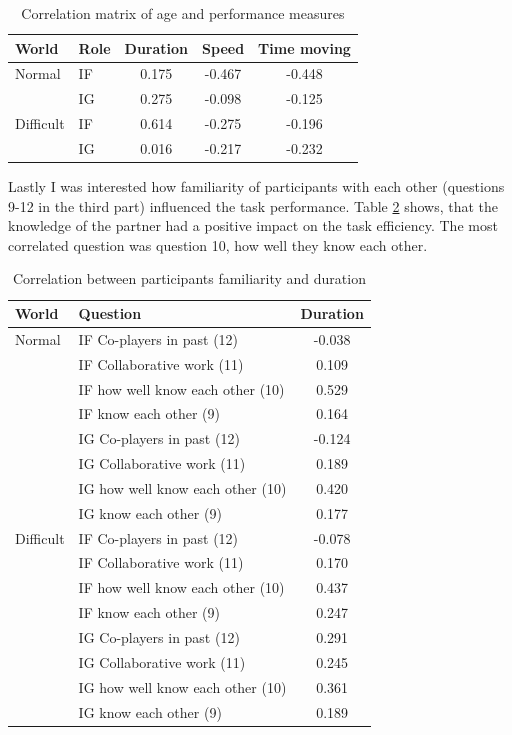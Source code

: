 \begin{table}[h!]
\centering
\begin{tabular}{llccc}
\toprule
World & Role  & Duration & Speed & Time moving  \\
\midrule
Normal 	& IF & 0.175 & -0.467 & -0.448\\
 		& IG & 0.275 & -0.098 & -0.125\\
\midrule
Difficult& IF & 0.614 &	-0.275 &-0.196\\
 		& IG  & 0.016 &	-0.217 &-0.232\\
\bottomrule
\end{tabular}
\caption{Correlation matrix of age and performance measures}
\label{tab:demfactors-age}
\end{table}

Lastly I was interested how familiarity of participants with each other (questions 9-12 in the third part) influenced the task performance. Table \ref{tab:demfactors-famother} shows, that the knowledge of the partner had a positive impact on the task efficiency. The most correlated question was question 10, how well they know each other.

\begin{table}[h!]
\centering
\begin{tabular}{llc}
\toprule
World & Question  & Duration \\
\midrule
Normal 	& IF Co-players in past (12) 	& -0.038\\
 		& IF Collaborative work 	(11)		& 0.109	 \\
 		& IF how well know each other (10)		& 0.529\\
 		& IF know each other (9)			& 0.164	\\
 		& IG Co-players in past (12) 	& -0.124\\
 		& IG Collaborative work 	(11)		& 0.189	 \\
 		& IG how well know each other (10)		& 0.420\\
 		& IG know each other (9)			& 0.177	\\
\midrule
Difficult& IF Co-players in past (12) 	& -0.078\\
 		& IF Collaborative work 	(11)		& 0.170	 \\
  		& IF how well know each other (10)		& 0.437\\
 		& IF know each other (9)			& 0.247	\\
 		& IG Co-players in past (12) 	& 0.291\\
 		& IG Collaborative work 	(11)		& 0.245	 \\
 		& IG how well know each other (10)		& 0.361\\
 		& IG know each other (9)			& 0.189	\\
\bottomrule
\end{tabular}
\caption{Correlation between participants familiarity and duration}
\label{tab:demfactors-famother}
\end{table}

